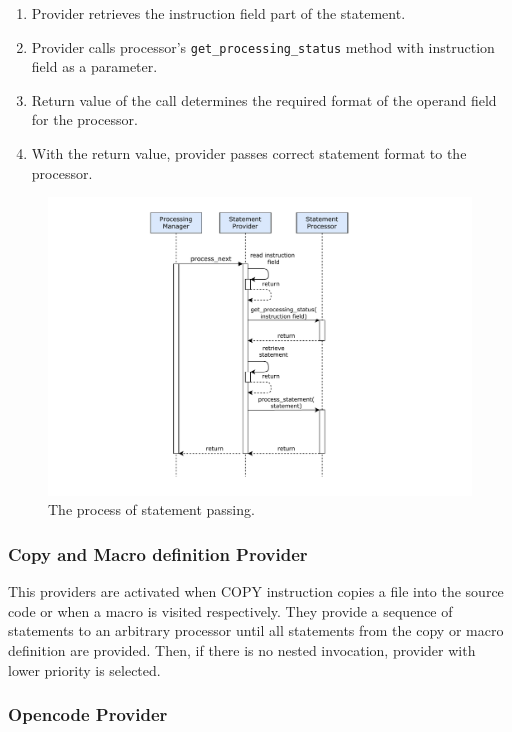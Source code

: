 \begin{enumerate}
	\item Provider retrieves the instruction field part of the statement.
	\item Provider calls processor's \texttt{get\_processing\_status} method with instruction field as a parameter.
	\item Return value of the call determines the required format of the operand field for the processor.
	\item With the return value, provider passes correct statement format to the processor. 
\end{enumerate}

\begin{figure}
	\centering
	\includegraphics[width=13cm]{img/process_next}
	\caption{The process of statement passing.}
	\label{fig06:process_next}
\end{figure}


\subsubsection{Copy and Macro definition Provider}

This providers are activated  when COPY instruction copies a file into the source code or when a macro is visited respectively. They provide a sequence of statements to an arbitrary processor until all statements from the copy or macro definition are provided. Then, if there is no nested invocation, provider with lower priority is selected.

\subsubsection{Opencode Provider}

